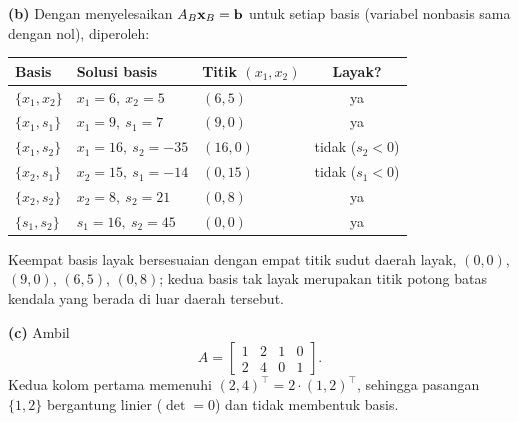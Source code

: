 \textbf{(b)} Dengan menyelesaikan $A_B \mathbf{x}_B = \mathbf{b}$ untuk setiap basis
(variabel nonbasis sama dengan nol), diperoleh:
\begin{center}
\begin{tabular}{l|l|l|c}
Basis & Solusi basis & Titik $(x_1, x_2)$ & Layak? \\
\hline
$\{x_1, x_2\}$ & $x_1 = 6,\ x_2 = 5$ & $(6, 5)$ & ya \\
$\{x_1, s_1\}$ & $x_1 = 9,\ s_1 = 7$ & $(9, 0)$ & ya \\
$\{x_1, s_2\}$ & $x_1 = 16,\ s_2 = -35$ & $(16, 0)$ & tidak ($s_2 < 0$) \\
$\{x_2, s_1\}$ & $x_2 = 15,\ s_1 = -14$ & $(0, 15)$ & tidak ($s_1 < 0$) \\
$\{x_2, s_2\}$ & $x_2 = 8,\ s_2 = 21$ & $(0, 8)$ & ya \\
$\{s_1, s_2\}$ & $s_1 = 16,\ s_2 = 45$ & $(0, 0)$ & ya \\
\end{tabular}
\end{center}
Keempat basis layak bersesuaian dengan empat titik sudut daerah layak,
$(0,0)$, $(9,0)$, $(6,5)$, $(0,8)$; kedua basis tak layak merupakan titik
potong batas kendala yang berada di luar daerah tersebut.

\textbf{(c)} Ambil
\[
A = \begin{bmatrix} 1 & 2 & 1 & 0 \\ 2 & 4 & 0 & 1 \end{bmatrix}.
\]
Kedua kolom pertama memenuhi $(2, 4)^\top = 2 \cdot (1, 2)^\top$, sehingga
pasangan $\{1, 2\}$ bergantung linier ($\det = 0$) dan tidak membentuk basis.


